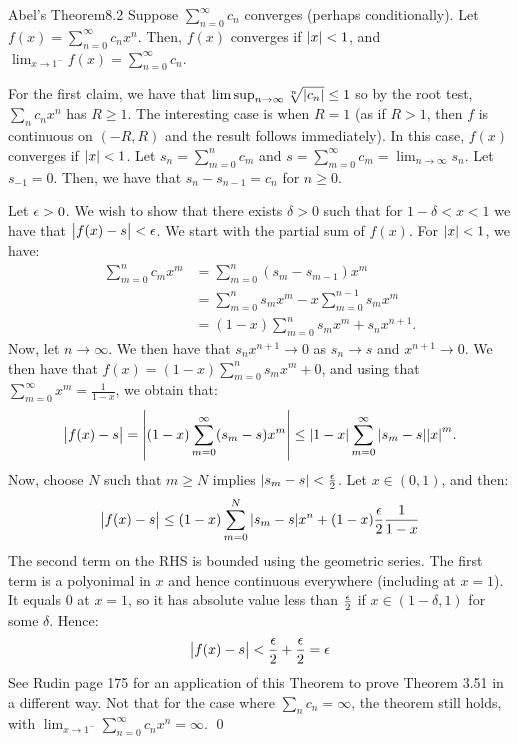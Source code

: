 \begin{theorem}{Abel's Theorem}{8.2}
    Suppose $\sum_{n=0}^\infty c_n$ converges (perhaps conditionally). Let $f(x) = \sum_{n=0}^\infty c_nx^n$. Then, $f(x)$ converges if $\abs{x} < 1$, and $\lim_{x \rightarrow 1^{-}}f(x) = \sum_{n=0}^\infty c_n$. 
\end{theorem}
\begin{nproof}
    For the first claim, we have that $\limsup_{n \rightarrow \infty}\sqrt[n]{\abs{c_n}} \leq 1$ so by the root test, $\sum_n c_n x^n$ has $R \geq 1$. The interesting case is when $R = 1$ (as if $R > 1$, then $f$ is continuous on $(-R, R)$ and the result follows immediately). In this case, $f(x)$ converges if $\abs{x} < 1$. Let $s_n = \sum_{m=0}^n c_m$ and $s = \sum_{m=0}^\infty c_m = \lim_{n \rightarrow \infty}s_n$. Let $s_{-1} = 0$. Then, we have that $s_n - s_{n-1} = c_n$ for $n \geq 0$.

    Let $\epsilon > 0$. We wish to show that there exists $\delta > 0$ such that for $1 -\delta < x < 1$ we have that $\abs{f(x) - s} < \epsilon$. We start with the partial sum of $f(x)$. For $\abs{x} < 1$, we have:
    \begin{align*}
        \sum_{m=0}^n c_mx^m &= \sum_{m=0}^n (s_m - s_{m-1})x^m
        \\ &= \sum_{m=0}^n s_mx^m - x\sum_{m=0}^{n-1}s_m x^m
        \\ &= (1-x)\sum_{m=0}^n s_mx^m + s_nx^{n+1}.
    \end{align*}
    Now, let $n \rightarrow \infty$. We then have that $s_nx^{n+1} \rightarrow 0$ as $s_n \rightarrow s$ and $x^{n+1} \rightarrow 0$. We then have that $f(x) = (1-x)\sum_{m=0}^n s_mx^m + 0$, and using that $\sum_{m=0}^\infty x^m = \frac{1}{1-x}$, we obtain that:
    \begin{align*}
        \abs{f(x) - s} = \abs{(1-x)\sum_{m=0}^\infty(s_m - s)x^m} \leq \abs{1 - x}\sum_{m=0}^\infty \abs{s_m - s}\abs{x}^m.
    \end{align*}
    Now, choose $N$ such that $m \geq N$ implies $\abs{s_m - s} < \frac{\epsilon}{2}$. Let $x \in (0, 1)$, and then:
    \begin{align*}
        \abs{f(x) - s} \leq (1-x)\sum_{m=0}^N\abs{s_m - s}x^n + (1-x)\frac{\epsilon}{2}\frac{1}{1-x}
    \end{align*}
    The second term on the RHS is bounded using the geometric series. The first term is a polyonimal in $x$ and hence continuous everywhere (including at $x = 1$). It equals $0$ at $x = 1$, so it has absolute value less than $\frac{\epsilon}{2}$ if $x \in (1-\delta, 1)$ for some $\delta$. Hence:
    \begin{align*}
        \abs{f(x) - s} < \frac{\epsilon}{2} + \frac{\epsilon}{2} = \epsilon
    \end{align*}
    \noindent See Rudin page 175 for an application of this Theorem to prove Theorem 3.51 in a different way. Not that for the case where $\sum_n c_n = \infty$, the theorem still holds, with $\lim_{x \rightarrow 1^-}\sum_{n=0}^\infty c_nx^n = \infty$. \qed
\end{nproof}

